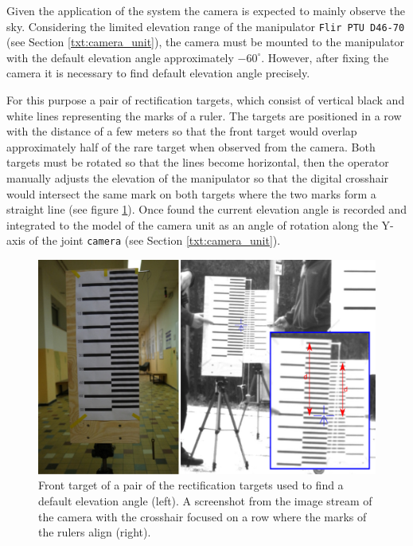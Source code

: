 Given the application of the system the camera is expected to mainly observe the sky. Considering the limited elevation range of the manipulator \texttt{Flir PTU D46-70} (see Section \ref{txt:camera_unit}), the camera must be mounted to the manipulator with the default elevation angle approximately $-60^{\circ}$. However, after fixing the camera it is necessary to find default elevation angle precisely. 

For this purpose a pair of rectification targets, which consist of vertical black and white lines representing the marks of a ruler. The targets are positioned in a row with the distance of a few meters so that the front target would overlap approximately half of the rare target when observed from the camera. Both targets must be rotated so that the lines become horizontal, then the operator manually adjusts the elevation of the manipulator so that the digital crosshair would intersect the same mark on both targets where the two marks form a straight line (see figure \ref{fig:rect_default_elevation_angle}). Once found the current elevation angle is recorded and integrated to the model of the camera unit as an angle of rotation along the Y-axis of the joint \texttt{camera} (see Section \ref{txt:camera_unit}).

\begin{figure}[htb]
	\centering
	\includegraphics[width=13cm]{fig/rect_default_elevation_angle.pdf}
	\caption{Front target of a pair of the rectification targets used to find a default elevation angle (left). A screenshot from the image stream of the camera with the crosshair focused on a row where the marks of the rulers align (right).}
	\label{fig:rect_default_elevation_angle}
\end{figure}


